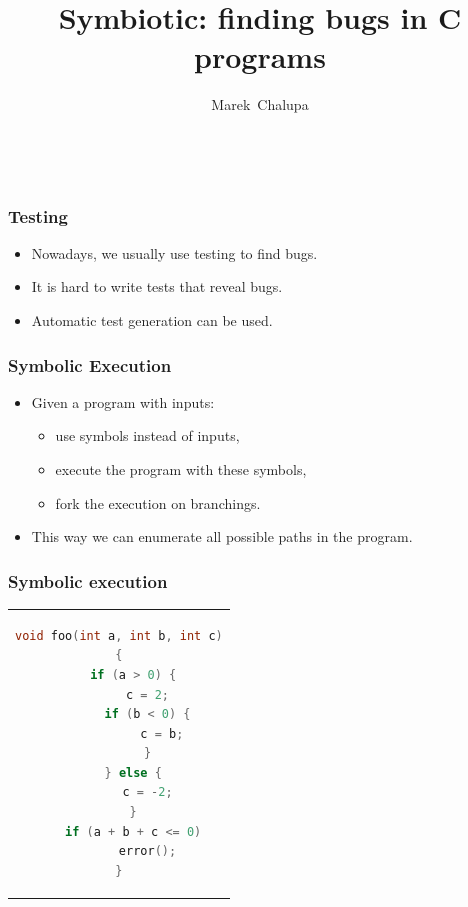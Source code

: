 \documentclass[sans]{beamer}
\title{\fontsize{0.905em}{1.5em}\selectfont Symbiotic: finding bugs in C programs}
\author{
 {Marek~Chalupa}
 }
\institute {DevConf 2019 , 25. 1. 2019}
\date{~\\[1cm]}
\begin{document}
\maketitle

\begin{frame}
\frametitle{Testing}
\begin{itemize}
  \item Nowadays, we usually use testing to find bugs.
  \item It is hard to write tests that reveal bugs.
  \item Automatic test generation can be used.
\end{itemize}
\end{frame}

\begin{frame}
\frametitle{Symbolic Execution}
\begin{itemize}
  \item Given a program with inputs:
  \begin{itemize}
    \item use symbols instead of inputs,
    \item execute the program with these symbols,
    \item fork the execution on branchings.
  \end{itemize}
  \item This way we can enumerate all possible paths in the program.
\end{itemize}
\end{frame}

\begin{frame}[fragile]
\frametitle{Symbolic execution}
\begin{center}
\begin{tabular}{c}
\begin{lstlisting}[language=C]
void foo(int a, int b, int c)
{
    if (a > 0) {
        c = 2;
        if (b < 0) {
            c = b;
        }
    } else {
        c = -2;
    }
    if (a + b + c <= 0)
        error();
}
\end{lstlisting}
\end{tabular}
\end{center}
\end{frame}
\end{document}
